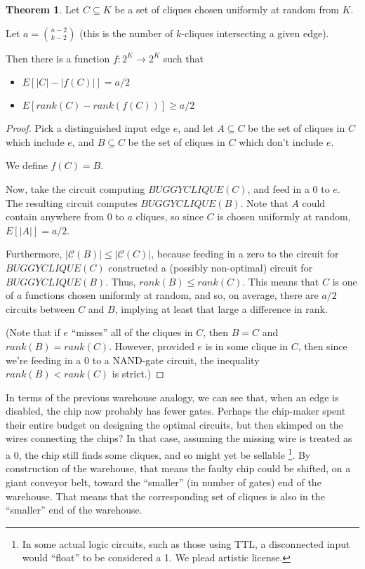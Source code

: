 \documentclass[12pt]{article}
\theoremstyle{definition}
\newtheorem{thm}{Theorem}[section]
\newcommand{\bigC}[0]{\mathcal{C}}
\begin{document}
\begin{thm}
\label{vaguelyUpward}
Let $C \subseteq K$ be a set of cliques chosen uniformly at random
from $K$.

Let $a = {n-2 \choose k-2}$ (this is the number of $k$-cliques
intersecting a given edge).

Then there is a function $f: 2^K \rightarrow 2^K$ such that
\begin{itemize}

\item $E[|C| - |f(C)|] = a/2$

\item $E[rank(C) - rank(f(C))] \ge a/2$

\end{itemize}

\end{thm}
\begin{proof}

Pick a distinguished input edge $e$, and let $A \subseteq C$ be
the set of cliques in $C$ which include $e$, and $B \subseteq C$ be
the set of cliques in $C$ which don't include $e$.

We define $f(C) = B$.

Now, take the circuit computing $BUGGYCLIQUE(C)$, and
feed in a 0 to $e$. The resulting circuit computes
$BUGGYCLIQUE(B)$. Note that $A$ could contain anywhere
from 0 to $a$
cliques, so since $C$ is chosen uniformly at random,
$E[|A|] = a/2$.

Furthermore, $|\bigC(B)| \le |\bigC(C)|$, because feeding in
a zero to the circuit for $BUGGYCLIQUE(C)$ constructed a
(possibly non-optimal) circuit for $BUGGYCLIQUE(B)$.
Thus, $rank(B) \le rank(C)$.
This means that
$C$ is one of $a$ functions chosen uniformly at random,
and so, on average, there are $a/2$ circuits between $C$
and $B$, implying at least that large a difference in rank.

(Note that if $e$ ``misses'' all of the cliques in $C$, then $B = C$
and $rank(B) = rank(C)$. However, provided $e$ is in some clique in $C$,
then since we're feeding in a 0 to a NAND-gate circuit,
the inequality $rank(B) < rank(C)$ is strict.)

\end{proof}

In terms of the previous warehouse analogy, we can see that,
when an edge is disabled, the chip now probably has fewer gates.
Perhaps the chip-maker spent their entire budget on designing the
optimal circuits, but then skimped on the wires connecting the chips?
In that case, assuming the missing wire is treated as a 0, the chip still
finds some cliques, and so might yet be sellable
\footnote{In some actual logic circuits, such as those
using TTL, a disconnected input
would ``float'' to be considered a 1. We plead artistic license.}.
By construction of the warehouse, that means the faulty chip could be shifted,
on a giant conveyor belt,
toward the ``smaller'' (in number of gates) end of the warehouse.
That means that the corresponding set of cliques is also
in the ``smaller'' end of the warehouse.
\end{document}
